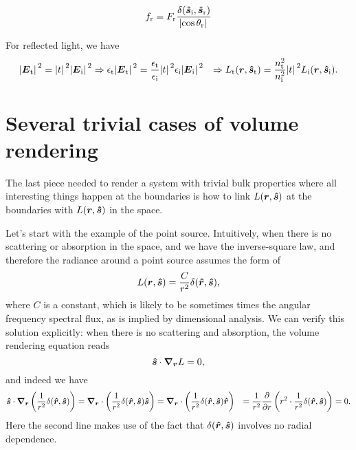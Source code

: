 \documentclass[hyperref, a4paper]{article}
\def\\{}%
\begin{document}
\begin{equation}
    f_{\text{r}} = F_{\text{r}} \frac{\delta(\vu*{s}_\text{i}, \vu*{s}_{\text{r}})}{\abs*{\cos \theta_{\text{r}}}}
\end{equation}

For reflected light, we have 
\begin{equation}
    \begin{aligned}
        \abs*{\vb*{E}_{\text{t}}}^2 = \abs*{t}^2 \abs*{\vb*{E}_{\text{i}}}^2 
        &\Rightarrow \epsilon_{\text{t}} \abs*{\vb*{E}_{\text{t}}}^2 
        = \frac{\epsilon_{\text{t}}}{\epsilon_{\text{i}}} \abs*{t}^2 \epsilon_{\text{i}} \abs*{\vb*{E}_{\text{i}}}^2 \\
        &\Rightarrow L_{\text{t}}(\vb*{r}, \vu*{s}_{\text{t}}) 
        = \frac{n_{\text{t}}^2}{n_{\text{i}}^2} \abs*{t}^2 L_{\text{i}}(\vb*{r}, \vu*{s}_{\text{i}}).
    \end{aligned}
\end{equation}

\section{Several trivial cases of volume rendering}

The last piece needed to render a system with trivial bulk properties 
where all interesting things happen at the boundaries 
is how to link $L(\vb*{r}, \vu*{s})$ at the boundaries 
with $L(\vb*{r}, \vu*{s})$ in the space. 

Let's start with the example of the point source.
Intuitively, when there is no scattering or absorption in the space,
and we have the inverse-square law,
and therefore the radiance around a point source assumes the form of 
\begin{equation}
    L(\vb*{r}, \vu*{s}) = \frac{C}{r^2} \delta(\vu*{r}, \vu*{s}),
\end{equation} 
where $C$ is a constant, which is likely to be 
sometimes times the angular frequency spectral flux,
as is implied by dimensional analysis.
We can verify this solution explicitly: 
when there is no scattering and absorption, 
the volume rendering equation reads 
\begin{equation}
    \vu*{s} \cdot \grad_{\vb*{r}} L = 0,
    \label{eq:trivial-bulk-re}
\end{equation}
and indeed we have  
\begin{equation}
    \begin{aligned}
        \vu*{s} \cdot \grad_{\vb*{r}} \left(\frac{1}{r^2} \delta(\vu*{r}, \vu*{s})\right) &= 
        \grad_{\vb*{r}} \cdot \left(
            \frac{1}{r^2} \delta(\vu*{r}, \vu*{s}) \vu*{s}
        \right) 
        = \grad_{\vb*{r}} \cdot \left(
            \frac{1}{r^2} \delta(\vu*{r}, \vu*{s}) \vu*{r}
        \right) \\
        &= \frac{1}{r^2} \pdv{r} \left(
            r^2 \cdot \frac{1}{r^2} \delta(\vu*{r}, \vu*{s})
        \right) = 0.
    \end{aligned}
    \label{eq:inverse-square-is-solution}
\end{equation}
Here the second line makes use of the fact 
that $\delta(\vu*{r}, \vu*{s})$ involves no radial dependence.
\end{document}
